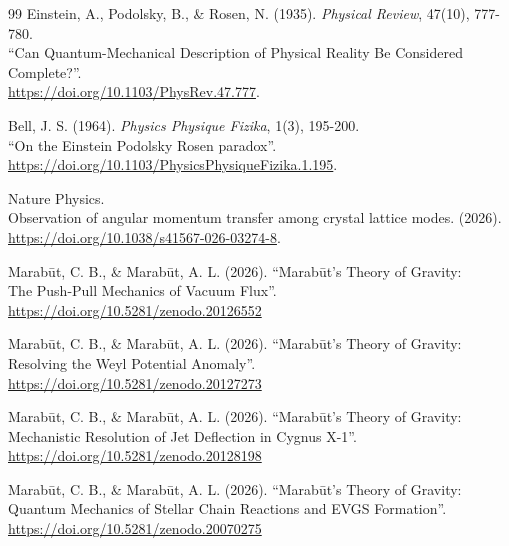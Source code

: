 \documentclass[11pt, a4paper]{article}
\begin{document}
\clearpage
\begin{thebibliography}{99}
   Einstein, A., Podolsky, B., \& Rosen, N. (1935). \textit{Physical Review}, 47(10), 777-780. \\
  ``Can Quantum-Mechanical Description of Physical Reality Be Considered Complete?''. \\
  \url{https://doi.org/10.1103/PhysRev.47.777}.

   Bell, J. S. (1964). \textit{Physics Physique Fizika}, 1(3), 195-200. \\
  ``On the Einstein Podolsky Rosen paradox''. \\
  \url{https://doi.org/10.1103/PhysicsPhysiqueFizika.1.195}.

   Nature Physics. \\
  Observation of angular momentum transfer among crystal lattice modes. (2026). \\
  \url{https://doi.org/10.1038/s41567-026-03274-8}.

  Marab\={u}t, C. B., \& Marab\={u}t, A. L. (2026). ``Marab\={u}t's Theory of Gravity: \\
  The Push-Pull Mechanics of Vacuum Flux''. \\
  \url{https://doi.org/10.5281/zenodo.20126552}

  Marab\={u}t, C. B., \& Marab\={u}t, A. L. (2026). ``Marab\={u}t's Theory of Gravity: \\
  Resolving the Weyl Potential Anomaly''. \\
  \url{https://doi.org/10.5281/zenodo.20127273}

  Marab\={u}t, C. B., \& Marab\={u}t, A. L. (2026). ``Marab\={u}t's Theory of Gravity: \\
  Mechanistic Resolution of Jet Deflection in Cygnus X-1''. \\
  \url{https://doi.org/10.5281/zenodo.20128198}

  Marab\={u}t, C. B., \& Marab\={u}t, A. L. (2026). ``Marab\={u}t's Theory of Gravity: \\
  Quantum Mechanics of Stellar Chain Reactions and EVGS Formation''. \\
  \url{https://doi.org/10.5281/zenodo.20070275}


\end{thebibliography}
\end{document}
